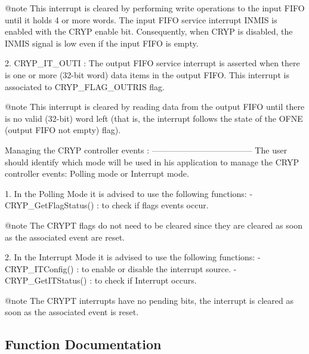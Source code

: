 \begin{DoxyVerb}
                @note This interrupt is cleared by performing write operations 
                      to the input FIFO until it holds 4 or more words. The 
                      input FIFO service interrupt INMIS is enabled with the 
                      CRYP enable bit. Consequently, when CRYP is disabled, the 
                      INMIS signal is low even if the input FIFO is empty.



   2. CRYP_IT_OUTI  : The output FIFO service interrupt is asserted when there 
                      is one or more (32-bit word) data items in the output FIFO.
                      This interrupt is associated to CRYP_FLAG_OUTRIS flag.

                @note This interrupt is cleared by reading data from the output 
                      FIFO until there is no valid (32-bit) word left (that is, 
                      the interrupt follows the state of the OFNE (output FIFO 
                      not empty) flag).


  Managing the CRYP controller events :
  ------------------------------------ 
  The user should identify which mode will be used in his application to manage 
  the CRYP controller events: Polling mode or Interrupt mode.

  1.  In the Polling Mode it is advised to use the following functions:
      - CRYP_GetFlagStatus() : to check if flags events occur. 

  @note  The CRYPT flags do not need to be cleared since they are cleared as 
         soon as the associated event are reset.   


  2.  In the Interrupt Mode it is advised to use the following functions:
      - CRYP_ITConfig()       : to enable or disable the interrupt source.
      - CRYP_GetITStatus()    : to check if Interrupt occurs.

  @note  The CRYPT interrupts have no pending bits, the interrupt is cleared as 
         soon as the associated event is reset. \end{DoxyVerb}
 

\subsection{Function Documentation}
\mbox{\label{group__CRYP__Group5_ga993d568b626a74b2973d4a6848a681f6}} 
